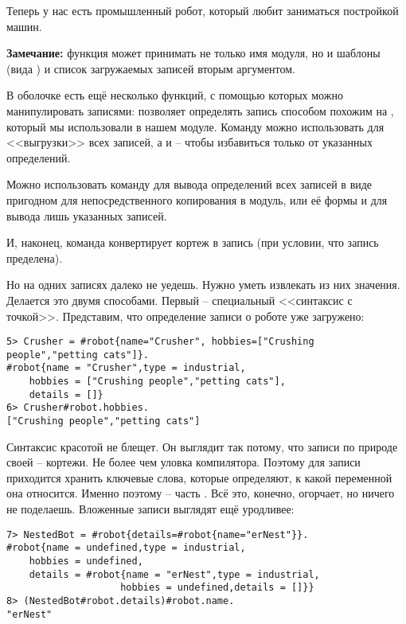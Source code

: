 Теперь у нас есть промышленный робот, который любит заниматься постройкой машин.\\
\colorbox{lgray}
{
\begin{minipage}{1.0\linewidth}
    \textbf{Замечание:}  функция  может принимать не только имя модуля, но и шаблоны (вида ) и список загружаемых записей вторым аргументом.

    В оболочке есть ещё несколько функций, с помощью которых можно манипулировать записями:  позволяет определять запись способом похожим на , который мы использовали в нашем модуле.
    Команду  можно использовать для <<выгрузки>> всех записей, а  и  \--- чтобы избавиться только от указанных определений.

    Можно использовать команду  для вывода определений всех записей в виде пригодном для непосредственного копирования в модуль, или её формы  и  для вывода лишь указанных записей.

    И, наконец, команда  конвертирует кортеж в запись (при условии, что запись пределена).
\end{minipage}
}

Но на одних записях далеко не уедешь.
Нужно уметь извлекать из них значения.
Делается это двумя способами.
Первый \--- специальный <<синтаксис с точкой>>.
Представим, что определение записи о роботе уже загружено:
\begin{lstlisting}[style=erlang]
5> Crusher = #robot{name="Crusher", hobbies=["Crushing people","petting cats"]}.
#robot{name = "Crusher",type = industrial,
    hobbies = ["Crushing people","petting cats"],
    details = []}
6> Crusher#robot.hobbies.
["Crushing people","petting cats"]
\end{lstlisting}

Синтаксис красотой не блещет.
Он выглядит так потому, что записи по природе своей \--- кортежи.
Не более чем уловка компилятора.
Поэтому для записи приходится хранить ключевые слова, которые определяют, к какой переменной она относится. Именно поэтому  \--- часть .
Всё это, конечно, огорчает, но ничего не поделаешь.
Вложенные записи выглядят ещё уродливее:
\begin{lstlisting}[style=erlang]
7> NestedBot = #robot{details=#robot{name="erNest"}}.
#robot{name = undefined,type = industrial,
    hobbies = undefined,
    details = #robot{name = "erNest",type = industrial,
                    hobbies = undefined,details = []}}
8> (NestedBot#robot.details)#robot.name.
"erNest"
\end{lstlisting}

